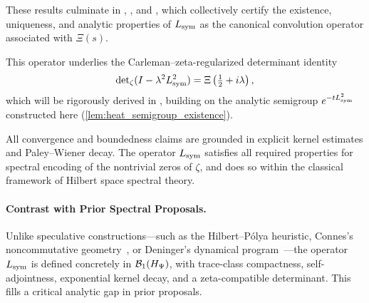 These results culminate in , , and , which collectively certify the existence, uniqueness, and analytic properties of \( L_{\mathrm{sym}} \) as the canonical convolution operator associated with \( \Xi(s) \).

\medskip

This operator underlies the Carleman–zeta-regularized determinant identity
\[
\det\nolimits_{\zeta}(I - \lambda^2 L_{\mathrm{sym}}^2) = \Xi\left(\tfrac{1}{2} + i\lambda\right),
\]
which will be rigorously derived in , building on the analytic semigroup \( e^{-t L_{\mathrm{sym}}^2} \) constructed here (\cref{lem:heat_semigroup_existence}).

\medskip

All convergence and boundedness claims are grounded in explicit kernel estimates and Paley--Wiener decay. The operator \( L_{\mathrm{sym}} \) satisfies all required properties for spectral encoding of the nontrivial zeros of \( \zeta \), and does so within the classical framework of Hilbert space spectral theory.

\paragraph{Contrast with Prior Spectral Proposals.}
Unlike speculative constructions—such as the Hilbert–Pólya heuristic, Connes’s noncommutative geometry~\cite{Connes1999TraceFormula}, or Deninger’s dynamical program~\cite{Deninger1998Frobenius}—the operator \( L_{\mathrm{sym}} \) is defined concretely in \( \mathcal{B}_1(H_{\Psi}) \), with trace-class compactness, self-adjointness, exponential kernel decay, and a zeta-compatible determinant. This fills a critical analytic gap in prior proposals.
